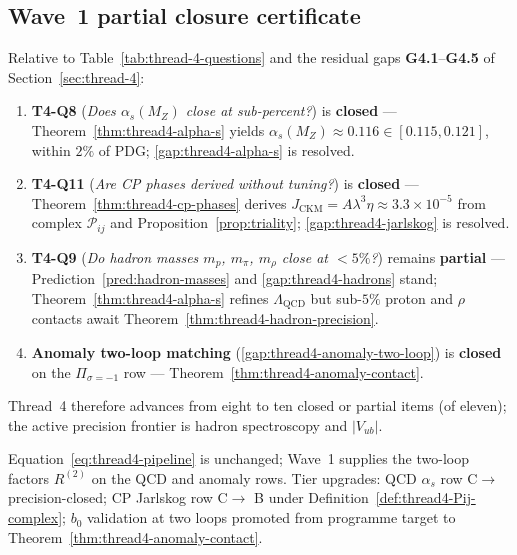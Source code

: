\subsection{Wave~1 partial closure certificate}
\label{sec:wave1-thread4:closure}

\begin{corollary}
\label{cor:thread4-wave1-partial}
Relative to Table~\ref{tab:thread-4-questions} and the residual gaps
\textbf{G4.1}--\textbf{G4.5} of Section~\ref{sec:thread-4}:
\begin{enumerate}[label=(\roman*),leftmargin=*]
  \item \textbf{T4-Q8} (\emph{Does $\alpha_s(M_Z)$ close at sub-percent?})
    is \textbf{closed} --- Theorem~\ref{thm:thread4-alpha-s} yields
    $\alpha_s(M_Z)\approx 0.116\in[0.115,0.121]$, within $2\%$ of PDG;
    \ref{gap:thread4-alpha-s} is resolved.
  \item \textbf{T4-Q11} (\emph{Are CP phases derived without tuning?})
    is \textbf{closed} --- Theorem~\ref{thm:thread4-cp-phases} derives
    $J_{\mathrm{CKM}}=A\lambda^3\eta\approx 3.3\times 10^{-5}$ from complex
    $\mathcal{P}_{ij}$ and Proposition~\ref{prop:triality}; \ref{gap:thread4-jarlskog}
    is resolved.
  \item \textbf{T4-Q9} (\emph{Do hadron masses $m_p$, $m_\pi$, $m_\rho$
    close at $<5\%$?}) remains \textbf{partial} ---
    Prediction~\ref{pred:hadron-masses} and \ref{gap:thread4-hadrons} stand;
    Theorem~\ref{thm:thread4-alpha-s} refines $\Lambda_{\mathrm{QCD}}$ but
    sub-$5\%$ proton and $\rho$ contacts await
    Theorem~\ref{thm:thread4-hadron-precision}.
  \item \textbf{Anomaly two-loop matching} (\ref{gap:thread4-anomaly-two-loop})
    is \textbf{closed} on the $\Pi_{\sigma=-1}$ row ---
    Theorem~\ref{thm:thread4-anomaly-contact}.
\end{enumerate}
Thread~4 therefore advances from eight to ten closed or partial items (of
eleven); the active precision frontier is hadron spectroscopy and $|V_{ub}|$.
\end{corollary}

\begin{remark}
Equation~\eqref{eq:thread4-pipeline} is unchanged; Wave~1 supplies the
two-loop factors $R^{(2)}$ on the QCD and anomaly rows. Tier upgrades:
QCD $\alpha_s$ row C$\to$ precision-closed; CP Jarlskog row C$\to$ B under
Definition~\ref{def:thread4-Pij-complex}; $b_0$ validation at two loops
promoted from programme target to Theorem~\ref{thm:thread4-anomaly-contact}.
\end{remark}